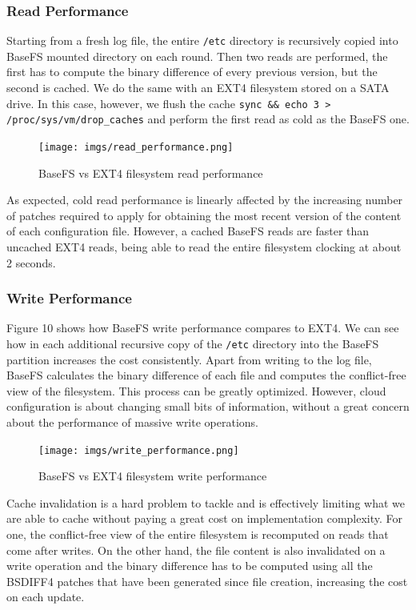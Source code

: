 \documentclass{sig-alternate}
\begin{document}
\subsubsection{Read Performance}

Starting from a fresh log file, the entire \texttt{/etc} directory is recursively copied into BaseFS mounted directory on each round. Then two reads are performed, the first has to compute the binary difference of every previous version, but the second is cached. We do the same with an EXT4 filesystem stored on a SATA drive. In this case, however, we flush the cache \texttt{sync \&\& echo 3 > /proc/sys/vm/drop\_caches} and perform the first read as cold as the BaseFS one.

\begin{figure}
\centering
\texttt{[image: imgs/read\_performance.png]}
\caption{BaseFS vs EXT4 filesystem read performance}
\label{fig:read-performance}
\end{figure}

As expected, cold read performance is linearly affected by the increasing number of patches required to apply for obtaining the most recent version of the content of each configuration file. However, a cached BaseFS reads are faster than uncached EXT4 reads, being able to read the entire filesystem clocking at about 2 seconds.

\subsubsection{Write Performance}


Figure 10 shows how BaseFS write performance compares to EXT4. We can see how in each additional recursive copy of the \texttt{/etc} directory into the BaseFS partition increases the cost consistently. Apart from writing to the log file, BaseFS calculates the binary difference of each file and computes the conflict-free view of the filesystem. This process can be greatly optimized. However, cloud configuration is about changing small bits of information, without a great concern about the performance of massive write operations.


\begin{figure}
\centering
\texttt{[image: imgs/write\_performance.png]}
\caption{BaseFS vs EXT4 filesystem write performance}
\label{fig:write-performance}
\end{figure}

Cache invalidation is a hard problem to tackle and is effectively limiting what we are able to cache without paying a great cost on implementation complexity. For one, the conflict-free view of the entire filesystem is recomputed on reads that come after 
writes. On the other hand, the file content is also invalidated on a write operation and the binary difference has to be computed using all the BSDIFF4 patches that have been generated since file creation, increasing the cost on each update.
\end{document}
